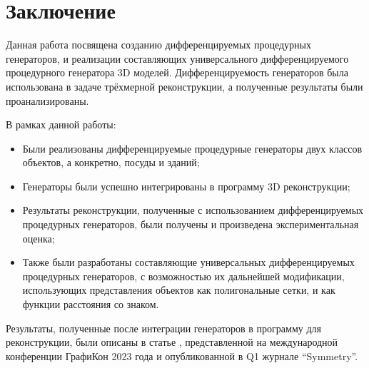 \documentclass[a4paper,hidelinks,12pt]{article}
\begin{document}
\section{Заключение}
Данная работа посвящена созданию дифференцируемых процедурных генераторов, и реализации составляющих универсального дифференцируемого процедурного генератора 3D моделей. Дифференцируемость генераторов была использована в задаче трёхмерной реконструкции, а полученные результаты были проанализированы.
\par
В рамках данной работы:
\begin{itemize}
    \item Были реализованы дифференцируемые процедурные генераторы двух классов объектов, а конкретно, посуды и зданий;
    \item Генераторы были успешно интегрированы в программу 3D реконструкции;
    \item Результаты реконструкции, полученные с использованием дифференцируемых процедурных генераторов, были получены и произведена экспериментальная оценка;
    \item Также были разработаны составляющие универсальных дифференцируемых процедурных генераторов, с возможностью их дальнейшей модификации, использующих представления объектов как полигональные сетки, и как функции расстояния со знаком.
\end{itemize}
\par
Результаты, полученные после интеграции генераторов в программу для реконструкции, были описаны в статье \cite{garifullin2023diff} \cite{garifullin2024single}, представленной на международной конференции ГрафиКон 2023 года и опубликованной в Q1 журнале “Symmetry”.


\newpage


\end{document}
